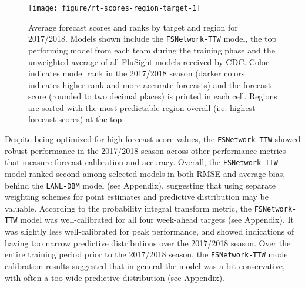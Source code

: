\documentclass{article}\usepackage[]{graphicx}\usepackage[]{color}
\newenvironment{knitrout}{}{} %
\begin{document}
 
\begin{knitrout}
\color{fgcolor}\begin{figure}
\texttt{[image: figure/rt-scores-region-target-1]} \caption[Average forecast scores and ranks by target and region for 2017/2018]{Average forecast scores and ranks by target and region for 2017/2018. Models shown include the {\tt FSNetwork-TTW} model, the top performing model from each team during the training phase and the unweighted average of all FluSight models received by CDC. Color indicates model rank in the 2017/2018 season (darker colors indicates higher rank and more accurate forecasts) and the forecast score (rounded to two decimal places) is printed in each cell. Regions are sorted with the most predictable region overall (i.e. highest forecast scores) at the top.}\label{fig:rt-scores-region-target}
\end{figure}


\end{knitrout}
 
 
Despite being optimized for high forecast score values, the {\tt FSNetwork-TTW} showed robust performance in the 2017/2018 season across other performance metrics that measure forecast calibration and accuracy.
Overall, the {\tt FSNetwork-TTW} model ranked second among selected models in both RMSE and average bias, behind the {\tt LANL-DBM} model (see Appendix), suggesting that using separate weighting schemes for point estimates and predictive distribution may be valuable.
According to the probability integral transform metric\cite{angus1994probability,diebold1997evaluating}, the {\tt FSNetwork-TTW} model was well-calibrated for all four week-ahead targets (see Appendix).
It was slightly less well-calibrated for peak performance, and showed indications of having too narrow predictive distributions over the 2017/2018 season.
Over the entire training period prior to the 2017/2018 season, the {\tt FSNetwork-TTW} model calibration results suggested that in general the model was a bit conservative, with often a too wide predictive distribution (see Appendix).


\end{document}
